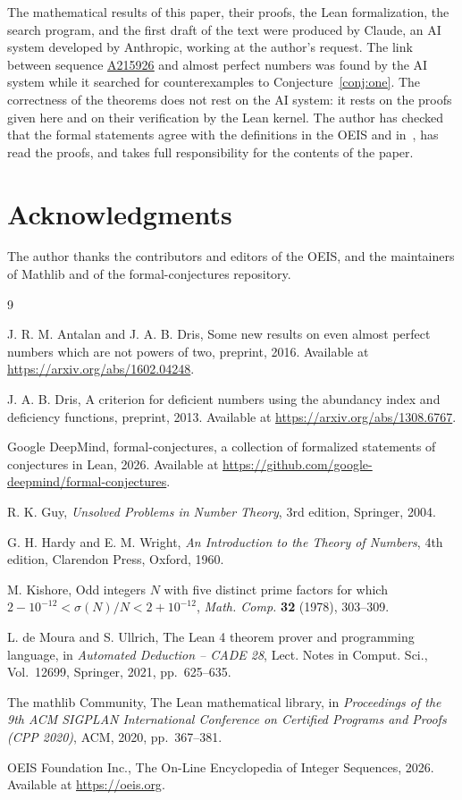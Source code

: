 \documentclass[12pt,reqno]{article}
\newcommand{\seqnum}[1]{\href{https://oeis.org/#1}{\rm \underline{#1}}}
\theoremstyle{plain}
\theoremstyle{definition}
\theoremstyle{remark}
\begin{document}
The mathematical results of this paper, their proofs, the Lean formalization,
the search program, and the first draft of the text were produced by Claude, an
AI system developed by Anthropic, working at the author's request. The link
between sequence \seqnum{A215926} and almost perfect numbers was found by the AI
system while it searched for counterexamples to Conjecture~\ref{conj:one}. The
correctness of the theorems does not rest on the AI system: it rests on the
proofs given here and on their verification by the Lean kernel. The author has
checked that the formal statements agree with the definitions in the OEIS and
in~\cite{fc}, has read the proofs, and takes full responsibility for the
contents of the paper.

\section{Acknowledgments}

The author thanks the contributors and editors of the OEIS, and the maintainers
of Mathlib and of the formal-conjectures repository.

\begin{thebibliography}{9}

J. R. M. Antalan and J. A. B. Dris, Some new results on even almost perfect
numbers which are not powers of two, preprint, 2016. Available at
\url{https://arxiv.org/abs/1602.04248}.

J. A. B. Dris, A criterion for deficient numbers using the abundancy index and
deficiency functions, preprint, 2013. Available at
\url{https://arxiv.org/abs/1308.6767}.

Google DeepMind, formal-conjectures, a collection of formalized statements of
conjectures in Lean, 2026. Available at
\url{https://github.com/google-deepmind/formal-conjectures}.

R. K. Guy, \emph{Unsolved Problems in Number Theory}, 3rd edition, Springer,
2004.

G. H. Hardy and E. M. Wright, \emph{An Introduction to the Theory of Numbers},
4th edition, Clarendon Press, Oxford, 1960.

M. Kishore, Odd integers $N$ with five distinct prime factors for which
$2 - 10^{-12} < \sigma(N)/N < 2 + 10^{-12}$, \emph{Math. Comp.} \textbf{32}
(1978), 303--309.

L. de Moura and S. Ullrich, The Lean 4 theorem prover and programming language,
in \emph{Automated Deduction -- CADE 28}, Lect. Notes in Comput. Sci.,
Vol.~12699, Springer, 2021, pp.~625--635.

The mathlib Community, The Lean mathematical library, in \emph{Proceedings of
the 9th ACM SIGPLAN International Conference on Certified Programs and Proofs
(CPP 2020)}, ACM, 2020, pp.~367--381.

OEIS Foundation Inc., The On-Line Encyclopedia of Integer Sequences, 2026.
Available at \url{https://oeis.org}.

\end{thebibliography}
\end{document}
